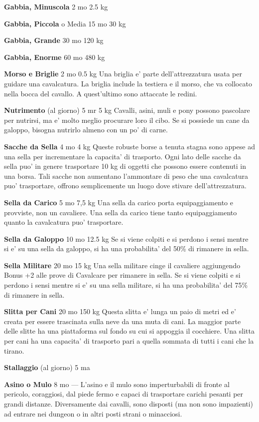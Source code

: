 \documentclass[a4paper,11pt,twoside,openany]{book}
\begin{document}
{\textbf{Gabbia, Minuscola} 2 mo 2.5 kg

\textbf{Gabbia, Piccola} o Media 15 mo 30 kg

\textbf{Gabbia, Grande} 30 mo 120 kg

\textbf{Gabbia, Enorme} 60 mo 480 kg

\textbf{Morso e Briglie} 2 mo 0.5 kg Una briglia e' parte dell'attrezzatura usata per guidare una cavalcatura. La briglia include la testiera e il morso, che va collocato nella bocca del cavallo. A quest'ultimo sono attaccate le redini.

\textbf{Nutrimento} (al giorno) 5 mr 5 kg Cavalli, asini, muli e pony possono pascolare per nutrirsi, ma e' molto meglio procurare loro il cibo. Se si possiede un cane da galoppo, bisogna nutrirlo almeno con un po' di carne.

\textbf{Sacche da Sella} 4 mo 4 kg Queste robuste borse a tenuta stagna sono appese ad una sella per incrementare la capacita' di trasporto. Ogni lato delle sacche da sella puo' in genere trasportare 10 kg di oggetti che possono essere contenuti in una borsa. Tali sacche non aumentano l'ammontare di peso che una cavalcatura puo' trasportare, offrono semplicemente un luogo dove stivare dell'attrezzatura.

\textbf{Sella da Carico} 5 mo 7,5 kg Una sella da carico porta equipaggiamento e provviste, non un cavaliere. Una sella da carico tiene tanto equipaggiamento quanto la cavalcatura puo' trasportare.

\textbf{Sella da Galoppo} 10 mo 12.5 kg Se si viene colpiti e si perdono i sensi mentre si e' su una sella da galoppo, si ha una probabilita' del 50\% di rimanere in sella.

\textbf{Sella Militare} 20 mo 15 kg Una sella militare cinge il cavaliere aggiungendo Bonus +2 alle prove di Cavalcare per rimanere in sella. Se si viene colpiti e si perdono i sensi mentre si e' su una sella militare, si ha una probabilita' del 75\% di rimanere in sella.

\textbf{Slitta per Cani} 20 mo 150 kg Questa slitta e' lunga un paio di metri ed e' creata per essere trascinata sulla neve da una muta di cani. La maggior parte delle slitte ha una piattaforma sul fondo su cui si appoggia il cocchiere. Una slitta per cani ha una capacita' di trasporto pari a quella sommata di tutti i cani che la tirano.

\textbf{Stallaggio} (al giorno) 5 ma 

\textbf{Asino o Mulo} 8 mo --- L'asino e il mulo sono imperturbabili di fronte al pericolo, coraggiosi, dal piede fermo e capaci di trasportare carichi pesanti per grandi distanze. Diversamente dai cavalli, sono disposti (ma non sono impazienti) ad entrare nei dungeon o in altri posti strani o minacciosi.

}
\end{document}
